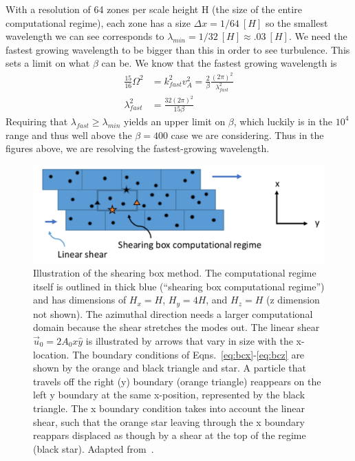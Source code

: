 With a resolution of 64 zones per scale height H (the size of the entire computational regime), each zone has a size $\Delta x=1/64~[H]$ so the smallest wavelength we can see corresponds to $\lambda_{min}=1/32~[H]\approx.03~[H]$. We need the fastest growing wavelength to be bigger than this in order to see turbulence. This sets a limit on what $\beta$ can be. We know that the fastest growing wavelength is
\begin{align*}
  \frac{15}{16}\Omega^2&=k^2_{fast}v_A^2=\frac2\beta\frac{(2\pi)^2}{\lambda_{fast}^2}\\
  \lambda_{fast}^2&=\frac{32(2\pi)^2}{15\beta}
\end{align*}
Requiring that $\lambda_{fast}\ge\lambda_{min}$ yields an upper limit on $\beta$, which luckily is in the $10^4$ range and thus well above the $\beta=400$ case we are considering. Thus in the figures above, we are resolving the fastest-growing wavelength.
\begin{figure}[h]
  \begin{center}  
    \includegraphics [width=\textwidth, angle=0.]{img/ShearingBox.pdf}
  \end{center}
  \caption{Illustration of the shearing box method. The computational regime itself is outlined in thick blue (``shearing box computational regime'') and has dimensions of $H_x=H$, $H_y=4H$, and $H_z=H$ (z dimension not shown). The azimuthal direction needs a larger computational domain because the shear stretches the modes out. The linear shear $\vec u_0=2A_0x\hat y$ is illustrated by arrows that vary in size with the x-location. The boundary conditions of Eqns.~\ref{eq:bcx}-\ref{eq:bcz} are shown by the orange and black triangle and star. A particle that travels off the right (y) boundary (orange triangle) reappears on the left y boundary at the same x-position, represented by the black triangle. The x boundary condition takes into account the linear shear, such that the orange star leaving through the x boundary reappars displaced as though by a shear at the top of the regime (black star). Adapted from~\citet{BH1998}.}
  \label{fig:shearingbox}
\end{figure}

